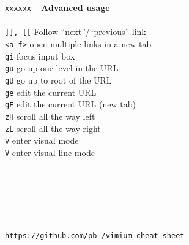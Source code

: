 \documentclass{article}
\newcommand{\widetabhead}{\texttt{xxxxxx}-- \= \kill}
\newcommand{\topic}[1]{\textbf{#1} \\ \\}
\newcommand{\cheat}[2]{\texttt{#1} \> #2 \\}
\begin{document}
\begin{multicols*}{4}
    \columnbreak
    
    \begin{tabbing}
      \widetabhead
      \topic{Advanced usage}
      \cheat{]], [[}{Follow \enquote{next}/\enquote{previous} link}
      \cheat{<a-f>}{open multiple links in a new tab}
      \cheat{gi}{focus input box}
      \cheat{gu}{go up one level in the URL}
      \cheat{gU}{go up to root of the URL}
      \cheat{ge}{edit the current URL}
      \cheat{gE}{edit the current URL (new tab)}
      \cheat{zH}{scroll all the way left}
      \cheat{zL}{scroll all the way right}
      \cheat{v}{enter visual mode}
      \cheat{V}{enter visual line mode}
      \\
      \\
      \\
      \\
      \\
      \\
      \footnotesize{\texttt{https://github.com/pb-/vimium-cheat-sheet}}
    \end{tabbing}
  \end{multicols*}
\end{document}
